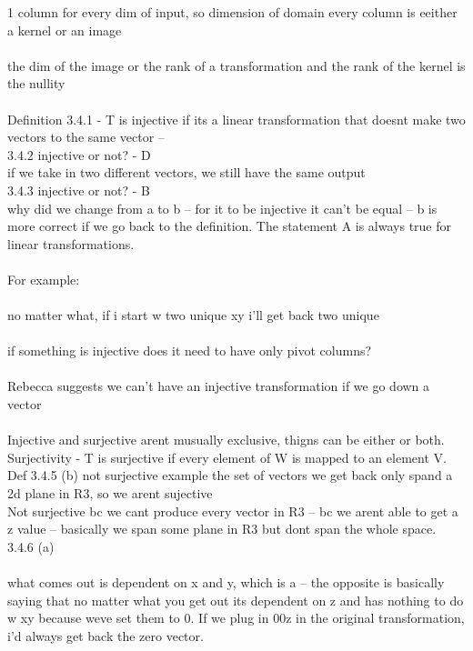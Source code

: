\documentclass{article}
\begin{document}
1 column for every dim of input, so dimension of domain
every column is eeither a kernel or an image\\
\\
the dim of the image or the rank of a transformation and the rank of the kernel is the nullity\\
\\
Definition 3.4.1 - T is injective if its a linear transformation that doesnt make two vectors to the same vector -- 
\\
3.4.2 injective or not? - D\\
if we take in two different vectors, we still have the same output\\
3.4.3 injective or not? - B\\ 
why did we change from a to b -- for it to be injective it can't be equal -- b is more correct if we go back to the definition. The statement A is always true for linear transformations. \\
\\
For example:\\
\\
no matter what, if i start w two unique xy i'll get back two unique\\
\\
if something is injective does it need to have only pivot columns?\\
\\
Rebecca suggests we can't have an injective transformation if we go down a vector\\
\\
Injective and surjective arent musually exclusive, thigns can be either or both.
Surjectivity - T is surjective if every element of W is mapped to an element V.\\
Def 3.4.5 (b) not surjective example the set of vectors we get back only spand a 2d plane in R3, so we arent sujective\\
Not surjective bc we cant produce every vector in R3 -- bc we arent able to get a z value -- basically we span some plane in R3 but dont span the whole space.
\\
3.4.6 (a) \\
\\
what comes out is dependent on x and y, which is a -- the opposite is basically saying that no matter what you get out its dependent on z and has nothing to do w xy because weve set them to 0. If we plug in 00z in the original transformation, i'd always get back the zero vector.\\
\end{document}
